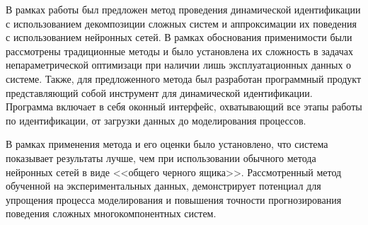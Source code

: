 \Conclusion %

В рамках работы был предложен метод проведения динамической идентификации с
использованием декомпозиции сложных систем и аппроксимации их поведения с
использованием нейронных сетей. В рамках обоснования применимости были
рассмотрены традиционные методы и было установлена их сложность в задачах
непараметрической оптимизаци при наличии лишь эксплуатационных данных о системе.
Также, для предложенного метода был разработан программный продукт
представляющий собой инструмент для динамической идентификации. Программа
включает в себя оконный интерфейс, охватывающий все этапы работы по
идентификации, от загрузки данных до моделирования процессов. 

В рамках применения метода и его оценки было установлено, что система показывает
результаты лучше, чем при использовании обычного метода нейронных сетей в виде
<<общего черного ящика>>. Рассмотренный метод обученной на экспериментальных
данных, демонстрирует потенциал для упрощения процесса моделирования и повышения
точности прогнозирования поведения сложных многокомпонентных систем. 



